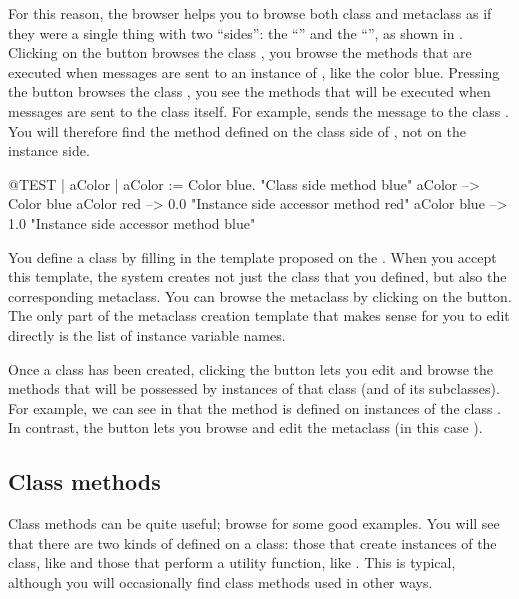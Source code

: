\documentclass[a4paper,10pt,twoside]{book}
\begin{document}
For this reason, the browser  helps you to browse both class and metaclass as if they were a single thing with two ``sides'': the ``'' and the ``'', as shown in . Clicking on the  button browses the class , \ie you browse the methods that are executed when messages
are sent to an instance of , like the color blue.
Pressing the  button browses the class , \ie you see the methods that will be executed when messages are sent to the class  itself.
For example,  sends the message  to the class .
You will therefore find the method  defined on the class side of , not on the instance side.

\begin{code}{@TEST | aColor |}
aColor := Color blue.               "Class side method blue"
aColor        --> Color blue
aColor red  --> 0.0         "Instance side accessor method red"
aColor blue --> 1.0        "Instance side accessor method blue"
\end{code}

You define a class by filling in the template proposed on the .
When you accept this template, the system creates not just the class that you defined, but also the corresponding metaclass.
You can browse the metaclass by clicking on the  button.
The only part of the metaclass creation template that makes sense for you to edit directly is the list of instance variable names.

Once a class has been created, clicking the  button lets you edit and browse the methods that will be possessed by instances of that class (and of its subclasses).
For example, we can see in  that the method  is defined on instances of the class .
In contrast, the  button lets you browse and edit the metaclass (in this case ).

\subsection{Class methods}

Class methods can be quite useful; browse  for some good examples.
You will see that there are two kinds of  defined on a class: those that create instances of the class, like  and those that perform a utility function, like .
This is typical, although you will occasionally find class methods used in other ways.
\end{document}
